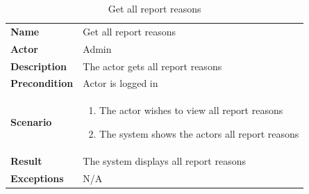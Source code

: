 \begin{table}[ht]
    \caption{Get all report reasons}
    \begin{tabular}{|L{5cm}|L{10cm}|}
        \toprule
        \textbf{Name}         & Get all report reasons                 \\
        \textbf{Actor}        & Admin                                  \\
        \textbf{Description}  & The actor gets all report reasons      \\
        \textbf{Precondition} & Actor is logged in                     \\
        \textbf{Scenario} &
        \vspace{-0.75cm}
        \begin{enumerate}
            \setlength\itemsep{-0.5em}
            \item The actor wishes to view all report reasons
            \item The system shows the actors all report reasons
        \end{enumerate} \\[-0.5cm]
        \textbf{Result}       & The system displays all report reasons \\
        \textbf{Exceptions}   & N/A                                    \\
        \bottomrule
    \end{tabular}
    \label{tab:table31}
\end{table}

